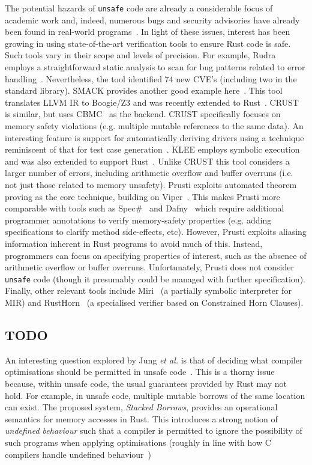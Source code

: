 The potential hazards of \lstinline{unsafe} code are already a
considerable focus of academic work and, indeed, numerous bugs and
security advisories have already been found in real-world
programs~\cite{BKALK21,XCSZ20}.  In light of these issues, interest
has been growing in using state-of-the-art verification tools to
ensure Rust code is safe.  Such tools vary in their scope and levels
of precision.  For example, Rudra employs a straightforward static
analysis to scan for bug patterns related to error
handling~\cite{BKALK21}.  Nevertheless, the tool identified 74 new
CVE's (including two in the standard library).  SMACK provides another
good example here~\cite{BCDJL06,MB08}.  This tool translates LLVM IR
to Boogie/Z3 and was recently extended to Rust~\cite{BHR18}.
CRUST~\cite{TPT15} is similar, but uses CBMC~\cite{KT14} as the
backend.  CRUST specifically focuses on memory safety violations
(e.g. multiple mutable references to the same data).  An interesting
feature is support for automatically deriving drivers using a
technique reminiscent of that for test case generation~\cite{PE07}.
KLEE employs symbolic execution and was also extended to support
Rust~\cite{LAL18,LFEL19}.  Unlike CRUST this tool considers a larger
number of errors, including arithmetic overflow and buffer overruns
(i.e. not just those related to memory unsafety).  Prusti exploits
automated theorem proving as the core technique, building on
Viper~\cite{AMPS19}.  This makes Prusti more comparable with tools
such as Spec\#~\cite{BFLMSV11,BDFLS04} and
Dafny~\cite{Leino10,Leino12} which require additional programmer
annotations to verify memory-safety properties (e.g.  adding
specifications to clarify method side-effects, etc).  However, Prusti
exploits aliasing information inherent in Rust programs to avoid much
of this.  Instead, programmers can focus on specifying properties of
interest, such as the absence of arithmetic overflow or buffer
overruns.  Unfortunately, Prusti does not consider \lstinline{unsafe}
code (though it presumably could be managed with further
specification).  Finally, other relevant tools include
Miri~\cite{Ols16,JDKJD20} (a partially symbolic interpreter for MIR)
and RustHorn~\cite{MTK20} (a specialised verifier based on Constrained
Horn Clauses).

\subsection{TODO}

An interesting question explored by Jung {\em et al.} is that of
deciding what compiler optimisations should be permitted in unsafe
code~\cite{JDKJD20}.  This is a thorny issue because, within unsafe
code, the usual guarantees provided by Rust may not hold.  For
example, in unsafe code, multiple mutable borrows of the same location
can exist.  The proposed system, {\em Stacked Borrows}, provides an
operational semantics for memory accesses in Rust.  This introduces a
strong notion of {\em undefined behaviour} such that a compiler is
permitted to ignore the possibility of such programs when applying
optimisations (roughly in line with how C compilers handle undefined
behaviour~\cite{MGDKRWS19})
